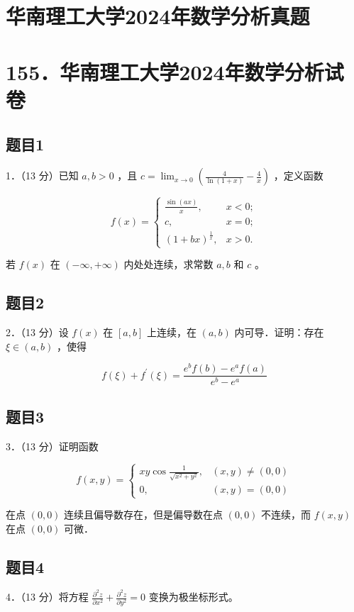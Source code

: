 \documentclass{article}
\begin{document}
\section*{华南理工大学2024年数学分析真题}
\section*{155．华南理工大学2024年数学分析试卷}

\subsection{题目1}
1．（13 分）已知 \(a, b>0\) ，且 \(c=\lim _{x \rightarrow 0}\left(\frac{4}{\ln (1+x)}-\frac{4}{x}\right)\) ，定义函数

\[
f(x)= \begin{cases}\frac{\sin (a x)}{x}, & x<0 ; \\ c, & x=0 ; \\ (1+b x)^{\frac{1}{x}}, & x>0 .\end{cases}
\]

若 \(f(x)\) 在 \((-\infty,+\infty)\) 内处处连续，求常数 \(a, b\) 和 \(c\) 。

\subsection{题目2}
2．（13 分）设 \(f(x)\) 在 \([a, b]\) 上连续，在 \((a, b)\) 内可导．证明：存在 \(\xi \in(a, b)\) ，使得

\[
f(\xi)+f^{\prime}(\xi)=\frac{e^{b} f(b)-e^{a} f(a)}{e^{b}-e^{a}}
\]

\subsection{题目3}
3．（13 分）证明函数

\[
f(x, y)= \begin{cases}x y \cos \frac{1}{\sqrt{x^{2}+y^{2}}}, & (x, y) \neq(0,0) \\ 0, & (x, y)=(0,0)\end{cases}
\]

在点 \((0,0)\) 连续且偏导数存在，但是偏导数在点 \((0,0)\) 不连续，而 \(f(x, y)\) 在点 \((0,0)\) 可微．

\subsection{题目4}
4．（13 分）将方程 \(\frac{\partial^{2} z}{\partial x^{2}}+\frac{\partial^{2} z}{\partial y^{2}}=0\) 变换为极坐标形式。
\end{document}

